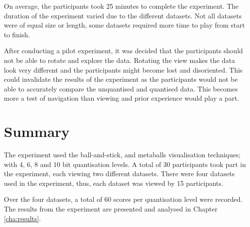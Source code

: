 On average, the participants took 25 minutes to complete the experiment. The
duration of the experiment varied due to the different datasets. Not all
datasets were of equal size or length, some datasets required more time to play
from start to finish.

After conducting a pilot experiment, it was decided that the participants
should not be able to rotate and explore the data. Rotating the view makes the
data look very different and the participants might become lost and
disoriented. This could invalidate the results of the experiment as the
participants would not be able to accurately compare the unquantised and
quantised data. This becomes more a test of navigation than viewing and prior
experience would play a part.


\section{Summary}
\label{sec:experiment_summary}

The experiment used the ball-and-stick, and metaballs visualisation techniques;
with 4, 6, 8 and 10 bit quantisation levels. A total of 30 participants took
part in the experiment, each viewing two different datasets. There were four
datasets used in the experiment, thus, each dataset was viewed by 15
participants.

Over the four datasets, a total of 60 scores per quantisation level were
recorded. The results from the experiment are presented and analysed in Chapter
\ref{cha:results}.



